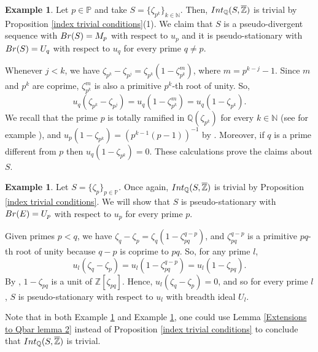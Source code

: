 \documentclass{article}
\theoremstyle{definition}\newtheorem{Def}[equation]{Definition}
\newtheorem{Ex}[equation]{Example}
\theoremstyle{definition}\newtheorem{Ques}[equation]{Question}
\theoremstyle{definition}\newtheorem{Conj}[equation]{Conjecture}
\theoremstyle{definition}\newtheorem{Not}[equation]{Notation}
\newcommand{\N}{\mathbb{N}}
\newcommand{\Q}{\mathbb{Q}}
\newcommand{\oZ}{\overline{\Z}}
\newcommand{\Z}{\mathbb{Z}}
\newcommand{\Int}{\textnormal{Int}}
\newcommand{\IntQ}{\Int_{\Q}}
\newcommand{\Br}{\textnormal{Br}}
\newcommand{\PP}{\mathbb{P}}
\numberwithin{equation}{section}
\begin{document}
\begin{Ex}\label{Root of unity example}
Let $p \in \PP$ and take $S=\{\zeta_{p^k}\}_{k\in\N}$. Then, $\IntQ(S,\oZ)$ is trivial by Proposition \ref{index trivial conditions}(1). We claim that $S$ is a pseudo-divergent sequence with $\Br(S)=M_p$ with respect to $u_p$ and it is pseudo-stationary with $\Br(S)=U_q$ with respect to $u_q$ for every prime $q\not=p$.

Whenever $j < k$, we have $\zeta_{p^k}-\zeta_{p^j}=\zeta_{p^k}(1-\zeta_{p^k}^{m})$, where $m=p^{k-j}-1$. Since $m$ and $p^k$ are coprime, $\zeta_{p^k}^m$ is also a primitive $p^k$-th root of unity. So,
\begin{equation*}
u_q(\zeta_{p^k}-\zeta_{p^j})=u_q(1-\zeta_{p^k}^m) = u_q(1-\zeta_{p^k}).
\end{equation*}
We recall that the prime $p$ is totally ramified in $\Q(\zeta_{p^k})$ for every $k\in\N$ (see for example \cite[Theorem 26]{Marcus}), and  $u_p(1-\zeta_{p^{k}})=(p^{k-1}(p-1))^{-1}$ by \cite[Chapter 2, p.\ 9]{Washington}. Moreover, if $q$ is a prime different from $p$ then $u_q(1-\zeta_{p^{k}})=0$. These calculations prove the claims about $S$. 
\end{Ex}

\begin{Ex}\label{Root of unity example 2} Let $S = \{\zeta_p\}_{p \in \PP}$. Once again, $\IntQ(S,\oZ)$ is trivial by Proposition \ref{index trivial conditions}. We will show that $S$ is pseudo-stationary with $\Br(E)=U_p$ with respect to $u_p$ for every prime $p$.

Given primes $p < q$, we have $\zeta_q - \zeta_p = \zeta_q(1 - \zeta_{pq}^{q-p})$, and $\zeta_{pq}^{q-p}$ is a primitive $pq$-th root of unity because $q-p$ is coprime to $pq$. So, for any prime $l$,
\begin{equation*}
u_l(\zeta_q - \zeta_p) = u_l(1 - \zeta_{pq}^{q-p}) = u_l(1 - \zeta_{pq}).
\end{equation*}
By \cite[Proposition 2.8]{Washington}, $1-\zeta_{pq}$ is a unit of $\Z[\zeta_{pq}]$. Hence,  $u_l(\zeta_q - \zeta_p) = 0$, and so for every prime $l$, $S$ is pseudo-stationary with respect to $u_l$ with breadth ideal $U_l$.
\end{Ex}

Note that in both Example \ref{Root of unity example} and Example \ref{Root of unity example 2}, one could use Lemma \ref{Extensions to Qbar lemma 2} instead of Proposition \ref{index trivial conditions} to conclude that $\IntQ(S,\oZ)$ is trivial.
\end{document}
